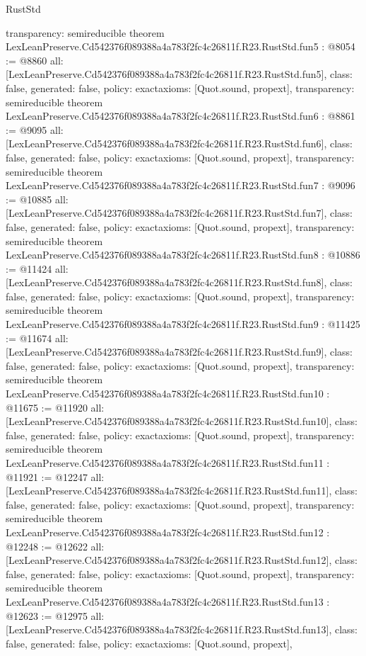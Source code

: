 \begin{lexlean}{RustStd}
\begin{coremodule}
{  transparency: semireducible
}
theorem LexLeanPreserve.Cd542376f089388a4a783f2fc4c26811f.R23.RustStd.fun5 : @8054 := @8860 {
  all: [LexLeanPreserve.Cd542376f089388a4a783f2fc4c26811f.R23.RustStd.fun5],
  class: false,
  generated: false,
  policy: exact{axioms: [Quot.sound, propext]},
  transparency: semireducible
}
theorem LexLeanPreserve.Cd542376f089388a4a783f2fc4c26811f.R23.RustStd.fun6 : @8861 := @9095 {
  all: [LexLeanPreserve.Cd542376f089388a4a783f2fc4c26811f.R23.RustStd.fun6],
  class: false,
  generated: false,
  policy: exact{axioms: [Quot.sound, propext]},
  transparency: semireducible
}
theorem LexLeanPreserve.Cd542376f089388a4a783f2fc4c26811f.R23.RustStd.fun7 : @9096 := @10885 {
  all: [LexLeanPreserve.Cd542376f089388a4a783f2fc4c26811f.R23.RustStd.fun7],
  class: false,
  generated: false,
  policy: exact{axioms: [Quot.sound, propext]},
  transparency: semireducible
}
theorem LexLeanPreserve.Cd542376f089388a4a783f2fc4c26811f.R23.RustStd.fun8 : @10886 := @11424 {
  all: [LexLeanPreserve.Cd542376f089388a4a783f2fc4c26811f.R23.RustStd.fun8],
  class: false,
  generated: false,
  policy: exact{axioms: [Quot.sound, propext]},
  transparency: semireducible
}
theorem LexLeanPreserve.Cd542376f089388a4a783f2fc4c26811f.R23.RustStd.fun9 : @11425 := @11674 {
  all: [LexLeanPreserve.Cd542376f089388a4a783f2fc4c26811f.R23.RustStd.fun9],
  class: false,
  generated: false,
  policy: exact{axioms: [Quot.sound, propext]},
  transparency: semireducible
}
theorem LexLeanPreserve.Cd542376f089388a4a783f2fc4c26811f.R23.RustStd.fun10 : @11675 := @11920 {
  all: [LexLeanPreserve.Cd542376f089388a4a783f2fc4c26811f.R23.RustStd.fun10],
  class: false,
  generated: false,
  policy: exact{axioms: [Quot.sound, propext]},
  transparency: semireducible
}
theorem LexLeanPreserve.Cd542376f089388a4a783f2fc4c26811f.R23.RustStd.fun11 : @11921 := @12247 {
  all: [LexLeanPreserve.Cd542376f089388a4a783f2fc4c26811f.R23.RustStd.fun11],
  class: false,
  generated: false,
  policy: exact{axioms: [Quot.sound, propext]},
  transparency: semireducible
}
theorem LexLeanPreserve.Cd542376f089388a4a783f2fc4c26811f.R23.RustStd.fun12 : @12248 := @12622 {
  all: [LexLeanPreserve.Cd542376f089388a4a783f2fc4c26811f.R23.RustStd.fun12],
  class: false,
  generated: false,
  policy: exact{axioms: [Quot.sound, propext]},
  transparency: semireducible
}
theorem LexLeanPreserve.Cd542376f089388a4a783f2fc4c26811f.R23.RustStd.fun13 : @12623 := @12975 {
  all: [LexLeanPreserve.Cd542376f089388a4a783f2fc4c26811f.R23.RustStd.fun13],
  class: false,
  generated: false,
  policy: exact{axioms: [Quot.sound, propext]},
}
\end{coremodule}
\end{lexlean}
